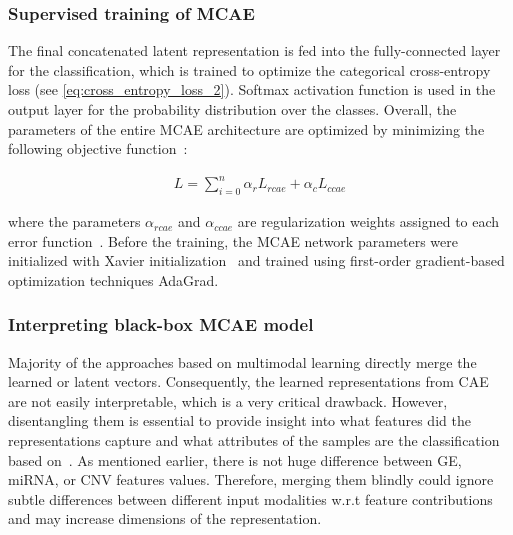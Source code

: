 \subsubsection{Supervised training of MCAE}
The final concatenated latent representation is fed into the fully-connected layer for the classification, which is trained to optimize the categorical cross-entropy loss (see \cref{eq:cross_entropy_loss_2}). Softmax activation function is used in the output layer for the probability distribution over the classes. Overall, the parameters of the entire MCAE architecture are optimized by minimizing the following objective function~\cite{mmdcae}:

\vspace{-4mm}
\begin{align}
    {L}=\sum_{i=0}^{n} \alpha_{r} {L}_{rcae}+\alpha_{c} {L}_{ccae}
    \label{eq:sum_2}
\end{align}

\hspace*{3.5mm} where the parameters $\alpha_{rcae}$ and $\alpha_{ccae}$ are regularization weights assigned to each error function~\cite{mmdcae}. Before the training, the MCAE network parameters were initialized with Xavier initialization~\cite{xavier} and trained using first-order gradient-based optimization techniques AdaGrad. 

\subsubsection{Interpreting black-box MCAE model}
Majority of the approaches based on multimodal learning directly merge the learned or latent vectors. Consequently, the learned representations from CAE are not easily interpretable, which is a very critical drawback. However, disentangling them is essential to provide insight into what features did the representations capture and what attributes of the samples are the classification based on~\cite{karimTCBB2020}. As mentioned earlier, there is not huge difference between GE, miRNA, or CNV features values. Therefore, merging them blindly could ignore subtle differences between different input modalities w.r.t feature contributions and may increase dimensions of the representation. 


